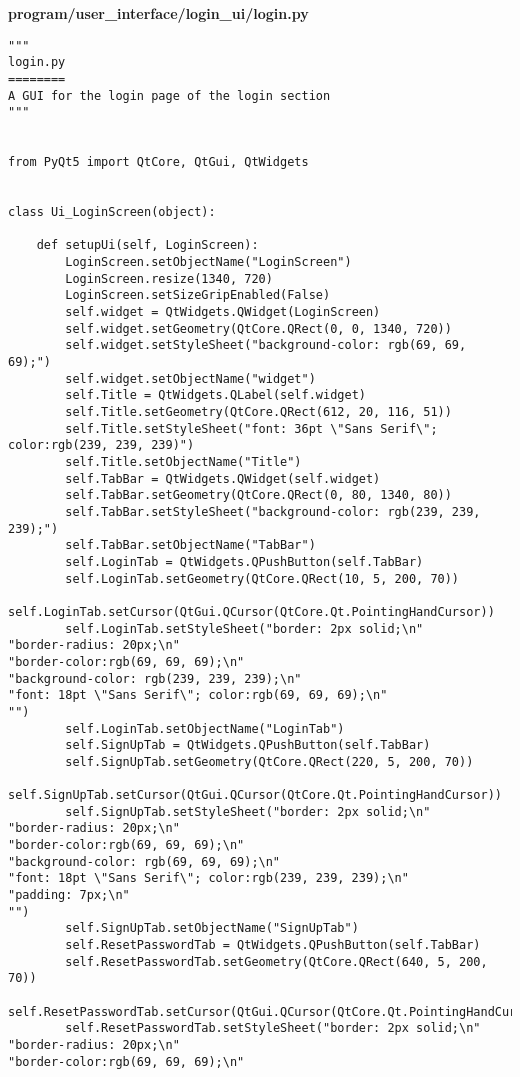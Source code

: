 \documentclass{article}
\begin{document}
\textbf{program/user\_interface/login\_ui/login.py}

\begin{lstlisting}
"""
login.py
========
A GUI for the login page of the login section
"""


from PyQt5 import QtCore, QtGui, QtWidgets


class Ui_LoginScreen(object):

    def setupUi(self, LoginScreen):
        LoginScreen.setObjectName("LoginScreen")
        LoginScreen.resize(1340, 720)
        LoginScreen.setSizeGripEnabled(False)
        self.widget = QtWidgets.QWidget(LoginScreen)
        self.widget.setGeometry(QtCore.QRect(0, 0, 1340, 720))
        self.widget.setStyleSheet("background-color: rgb(69, 69, 69);")
        self.widget.setObjectName("widget")
        self.Title = QtWidgets.QLabel(self.widget)
        self.Title.setGeometry(QtCore.QRect(612, 20, 116, 51))
        self.Title.setStyleSheet("font: 36pt \"Sans Serif\"; color:rgb(239, 239, 239)")
        self.Title.setObjectName("Title")
        self.TabBar = QtWidgets.QWidget(self.widget)
        self.TabBar.setGeometry(QtCore.QRect(0, 80, 1340, 80))
        self.TabBar.setStyleSheet("background-color: rgb(239, 239, 239);")
        self.TabBar.setObjectName("TabBar")
        self.LoginTab = QtWidgets.QPushButton(self.TabBar)
        self.LoginTab.setGeometry(QtCore.QRect(10, 5, 200, 70))
        self.LoginTab.setCursor(QtGui.QCursor(QtCore.Qt.PointingHandCursor))
        self.LoginTab.setStyleSheet("border: 2px solid;\n"
"border-radius: 20px;\n"
"border-color:rgb(69, 69, 69);\n"
"background-color: rgb(239, 239, 239);\n"
"font: 18pt \"Sans Serif\"; color:rgb(69, 69, 69);\n"
"")
        self.LoginTab.setObjectName("LoginTab")
        self.SignUpTab = QtWidgets.QPushButton(self.TabBar)
        self.SignUpTab.setGeometry(QtCore.QRect(220, 5, 200, 70))
        self.SignUpTab.setCursor(QtGui.QCursor(QtCore.Qt.PointingHandCursor))
        self.SignUpTab.setStyleSheet("border: 2px solid;\n"
"border-radius: 20px;\n"
"border-color:rgb(69, 69, 69);\n"
"background-color: rgb(69, 69, 69);\n"
"font: 18pt \"Sans Serif\"; color:rgb(239, 239, 239);\n"
"padding: 7px;\n"
"")
        self.SignUpTab.setObjectName("SignUpTab")
        self.ResetPasswordTab = QtWidgets.QPushButton(self.TabBar)
        self.ResetPasswordTab.setGeometry(QtCore.QRect(640, 5, 200, 70))
        self.ResetPasswordTab.setCursor(QtGui.QCursor(QtCore.Qt.PointingHandCursor))
        self.ResetPasswordTab.setStyleSheet("border: 2px solid;\n"
"border-radius: 20px;\n"
"border-color:rgb(69, 69, 69);\n"

\end{lstlisting}
\end{document}
